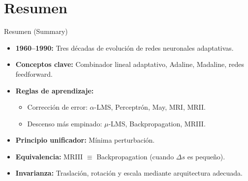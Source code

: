 \documentclass[aspectratio=169,utf8,spanish]{beamer}
\begin{document}
\section{Resumen}

\begin{frame}{Resumen (Summary)}
  \begin{itemize}
    \item \textbf{1960--1990:} Tres décadas de evolución de redes neuronales adaptativas.
    \item \textbf{Conceptos clave:} Combinador lineal adaptativo, Adaline, Madaline, redes feedforward.
    \item \textbf{Reglas de aprendizaje:}
    \begin{itemize}
      \item Corrección de error: $\alpha$-LMS, Perceptrón, May, MRI, MRII.
      \item Descenso más empinado: $\mu$-LMS, Backpropagation, MRIII.
    \end{itemize}
    \item \textbf{Principio unificador:} Mínima perturbación.
    \item \textbf{Equivalencia:} MRIII $\equiv$ Backpropagation (cuando $\Delta s$ es pequeño).
    \item \textbf{Invarianza:} Traslación, rotación y escala mediante arquitectura adecuada.
  \end{itemize}
\end{frame}
\end{document}
